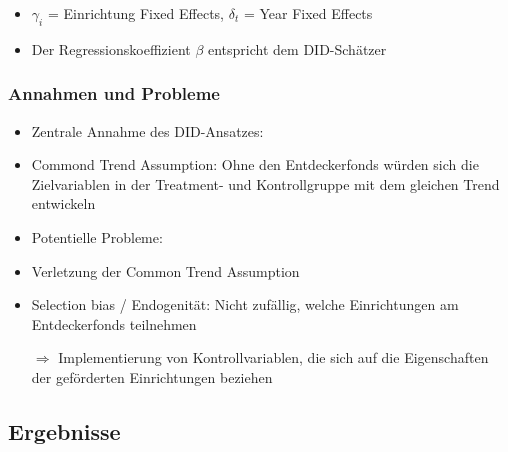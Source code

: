 \begin{frame}[fragile]
\begin{frame}[fragile]
\begin{frame}[fragile]
\begin{itemize}
\item $\gamma_{i}$ = Einrichtung Fixed Effects, $\delta_{t}$ = Year Fixed Effects
\item Der Regressionskoeffizient $\beta$ entspricht dem DID-Schätzer
\end{itemize}
\end{frame}

\begin{frame}[fragile]
\frametitle{Annahmen und Probleme}
\begin{itemize}
\item Zentrale Annahme des DID-Ansatzes:
\item Commond Trend Assumption: Ohne den Entdeckerfonds würden sich die Zielvariablen in der Treatment- und Kontrollgruppe mit dem gleichen Trend entwickeln
\linebreak
\item Potentielle Probleme:
\item Verletzung der Common Trend Assumption
\item Selection bias / Endogenität: Nicht zufällig, welche Einrichtungen am Entdeckerfonds teilnehmen
\item [$\Rightarrow$] Implementierung von Kontrollvariablen, die sich auf die Eigenschaften der geförderten Einrichtungen beziehen
\end{itemize}
\end{frame}

\subsection{Ergebnisse}


\end{frame}
\end{frame}
